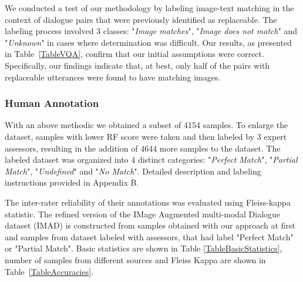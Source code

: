 \documentclass[11pt]{article}
\begin{document}
\smallskip

We conducted a test of our methodology by labeling image-text matching in the context of dialogue pairs that were previously identified as replaceable. The labeling process involved 3 classes: "\textit{Image matches}", "\textit{Image does not match}" and "\textit{Unknown}" in cases where determination was difficult. Our results, as presented in Table~\ref{TableVQA}, confirm that our initial assumptions were correct. Specifically, our findings indicate that, at best, only half of the pairs with replaceable utterances were found to have matching images.




\subsubsection{Human Annotation}

With an above methodic we obtained a subset of 4154 samples. To enlarge the dataset, samples with lower RF score were taken and then labeled by 3 expert assessors, resulting in the addition of 4644 more samples to the dataset. The labeled dataset was organized into 4 distinct categories: "\textit{Perfect Match}", "\textit{Partial Match}", "\textit{Undefined}" and "\textit{No Match}". Detailed description and labeling instructions provided  in Appendix B.

\smallskip

The inter-rater reliability of their annotations was evaluated using Fleiss-kappa statistic. The refined version of the IMage Augmented multi-modal Dialogue dataset (IMAD) is constructed from samples obtained with our approach at first and samples from dataset labeled with assessors, that had label "Perfect Match" or "Partial Match". Basic statistics are shown in Table \ref{TableBasicStatistics}, number of samples from different sources and Fleiss Kappa are shown in Table~\ref{TableAccuracies}.
\end{document}
